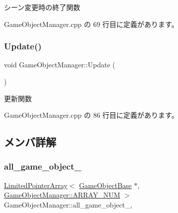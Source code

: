 シーン変更時の終了関数 



 Game\+Object\+Manager.\+cpp の 69 行目に定義があります。

\mbox{\label{class_game_object_manager_a6f053b1c655de6ca1c9a8fa9b6e118ae}} 
\subsubsection{\texorpdfstring{Update()}{Update()}}
{\footnotesize\ttfamily void Game\+Object\+Manager\+::\+Update (\begin{DoxyParamCaption}{ }\end{DoxyParamCaption})\hspace{0.3cm}{\ttfamily [static]}}



更新関数 



 Game\+Object\+Manager.\+cpp の 86 行目に定義があります。



\subsection{メンバ詳解}
\mbox{\label{class_game_object_manager_aeaf98831f542f93db15c54a4948d6331}} 
\subsubsection{\texorpdfstring{all\+\_\+game\+\_\+object\+\_\+}{all\_game\_object\_}}
{\footnotesize\ttfamily \mbox{\hyperlink{class_limited_pointer_array}{Limited\+Pointer\+Array}}$<$ \mbox{\hyperlink{class_game_object_base}{Game\+Object\+Base}} $\ast$, \mbox{\hyperlink{class_game_object_manager_a591934d64d750c10c03c908371470681}{Game\+Object\+Manager\+::\+A\+R\+R\+A\+Y\+\_\+\+N\+UM}} $>$ Game\+Object\+Manager\+::all\+\_\+game\+\_\+object\+\_\+\hspace{0.3cm}{\ttfamily [static]}, {\ttfamily [private]}}



